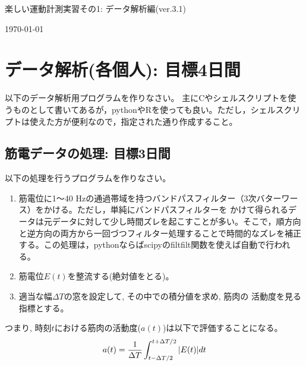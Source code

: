 \documentclass{jsarticle}
\def\version{3.1}
\begin{document}
\begin{center}
  {\LARGE 楽しい運動計測実習その1: データ解析編(ver.\version)}
\end{center}
\begin{flushright}
\today
\end{flushright}





\section{データ解析(各個人): 目標4日間}
以下のデータ解析用プログラムを作りなさい。
主にCやシェルスクリプトを使うものとして書いてあるが，pythonやRを使っても良い。ただし，シェルスクリプトは使えた方が便利なので，指定された通り作成すること。

\subsection{筋電データの処理: 目標3日間}
以下の処理を行うプログラムを作りなさい。
\begin{enumerate}
\item 筋電位に1〜40 Hzの通過帯域を持つバンドパスフィルター（3次バターワース）をかける。ただし，単純にバンドパスフィルターを
かけて得られるデータは元データに対して少し時間ズレを起こすことが多い。そこで，順方向と逆方向の両方から一回づつフィルター処理することで時間的なズレを補正する。この処理は，pythonならばscipyのfiltfilt関数を使えば自動で行われる。
\item 筋電位$E(t)$を整流する(絶対値をとる)。
\item 適当な幅$\Delta T$の窓を設定して, その中での積分値を求め, 筋肉の
  活動度を見る指標とする。
\end{enumerate}
つまり, 時刻$t$における筋肉の活動度($a(t)$)は以下で評価することになる。
\begin{align}
  a(t)=\frac{1}{\Delta T}\int_{t-\Delta T/2}^{t+\Delta T/2}|E(t)|dt\notag
\end{align}
\end{document}
